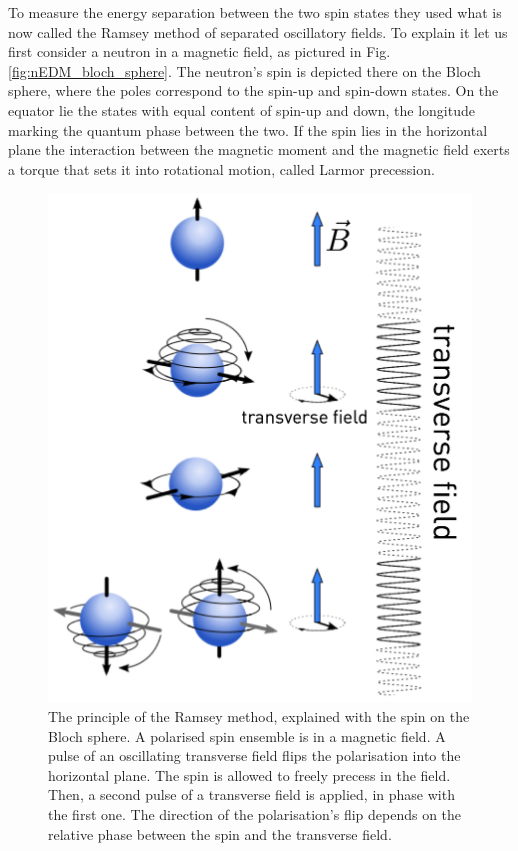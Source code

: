 To measure the energy separation between the two spin states they used what is now called the Ramsey method of separated oscillatory fields. To explain it let us first consider a neutron in a magnetic field, as pictured in Fig.\,\ref{fig:nEDM_bloch_sphere}. The neutron's spin is depicted there on the Bloch sphere, where the poles correspond to the spin-up and spin-down states. On the equator lie the states with equal content of spin-up and down, the longitude marking the quantum phase between the two. If the spin lies in the horizontal plane the interaction between the magnetic moment and the magnetic field exerts a torque that sets it into rotational motion, called Larmor precession.

\begin{figure}
  \centering
  \includegraphics[width=.6\linewidth]{gfx/nEDMatPSI/Ramsey_principle.png}
  \caption{The principle of the Ramsey method, explained with the spin on the Bloch sphere. A polarised spin ensemble is in a magnetic field. A pulse of an oscillating transverse field flips the polarisation into the horizontal plane. The spin is allowed to freely precess in the field. Then, a second pulse of a transverse field is applied, in phase with the first one. The direction of the polarisation's flip depends on the relative phase between the spin and the transverse field.}
  \label{fig:nEDM_Ramsey_principle}
\end{figure}

